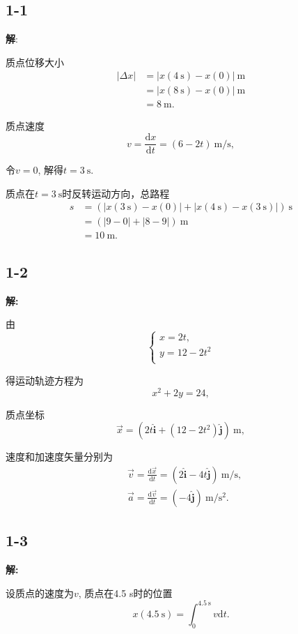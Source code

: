 \documentclass[twocolumn]{ctexart}
\begin{document}
 
\subsection*{1-1} 
\noindent 
\textbf{解}: 

质点位移大小 
\begin{align*} 
|\Delta x|&=|x(4\ \mathrm{s})-x(0)|\ \mathrm{m} \\ 
&=|x(8\ \mathrm{s})-x(0)|\ \mathrm{m} \\ 
&=8\ \mathrm{m}. 
\end{align*} 


质点速度 
$$v=\frac{\mathrm{d}x}{\mathrm{d}t}=(6-2t)\ \mathrm{m/s},$$ 

令$v=0$, 解得$t=3\ \mathrm{s}$. 

质点在$t=3\ \mathrm{s}$时反转运动方向，总路程 
\begin{align*} 
s&=(|x(3\ \mathrm{s})-x(0)|+|x(4\ \mathrm{s})-x(3\ \mathrm{s})|)\ \mathrm{s}\\ 
&=(|9-0|+|8-9|)\ \mathrm{m}\\ 
&=10\ \mathrm{m}. 
\end{align*} 

\subsection*{1-2} 
\noindent 
\textbf{解:} 

由 
$$\left\{ 
\begin{array}{ll} 
x=2t,\\ 
y=12-2t^2\\ 
\end{array} 
\right. 
$$ 

得运动轨迹方程为 
$$x^2+2y=24,$$ 


质点坐标$$\vec{x}=(2t\hat{\mathbf{i}}+(12-2t^2)\hat{\mathbf{j}} )\ \mathrm{m},$$ 

速度和加速度矢量分别为 
\begin{align*} 
&\vec{v}=\frac{\mathrm{d}\vec{x}}{\mathrm{d}t}=(2\hat{\mathbf{i}}-4t\hat{\mathbf{j}})\ \mathrm{m/s},\\ 
&\vec{a}=\frac{\mathrm{d}\vec{v}}{\mathrm{d}t}=(-4\hat{\mathbf{j}})\ \mathrm{m/s^2}. 
\end{align*} 
\subsection*{1-3} 
\noindent 
\textbf{解:} 

设质点的速度为$v$, 质点在4.5 s时的位置 
$$x(4.5\ \mathrm{s})=\int_{0}^{4.5\ \mathrm{s}}v\mathrm{d}t.$$ 
\end{document}
